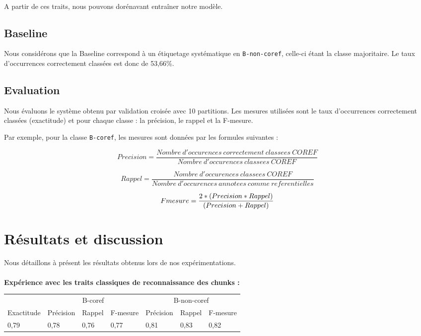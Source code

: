 \documentclass[a4paper,12pt]{article}
\begin{document}
\paragraph{}
A partir de ces traits, nous pouvons dorénavant entraîner notre modèle.


\subsection{Baseline}

Nous considérons que la Baseline correspond à un étiquetage systématique en \verb!B-non-coref!, celle-ci étant la classe majoritaire.
Le taux d'occurrences correctement classées est donc de 53,66\%.

\subsection{Evaluation}

Nous évaluons le système obtenu par validation croisée avec 10 partitions. Les mesures utilisées sont le taux d'occurrences correctement classées (exactitude) et pour chaque classe : la précision, le rappel et la F-mesure.

Par exemple, pour la classe \verb!B-coref!, les mesures sont données par les formules suivantes :

\[ Precision = \frac{Nombre\ d'occurences\ correctement\ classees\ COREF}{Nombre\ d'occurences\ classees\ COREF} \]

\[ Rappel = \frac{Nombre\ d'occurences\ classees\ COREF}{Nombre\ d'occurences\ annotees\ comme\ referentielles} \]

\[ F\-mesure = \frac{2 * (Precision * Rappel)}{(Precision + Rappel)} \]


\section{Résultats et discussion}
\label{resultats}

Nous détaillons à présent les résultats obtenus lors de nos expérimentations.

\paragraph{}
\textbf{Expérience avec les traits classiques de reconnaissance des chunks :}

\begin{tabular}[H]{l|lll|lll}
& \multicolumn{3}{c|}{B-coref} & \multicolumn{3}{c}{B-non-coref}\\
Exactitude & Précision & Rappel & F-mesure & Précision & Rappel & F-mesure\\
\hline
0,79 & 0,78 & 0,76 & 0,77 & 0,81 & 0,83 & 0,82\\
\hline
\end{tabular}
\end{document}
